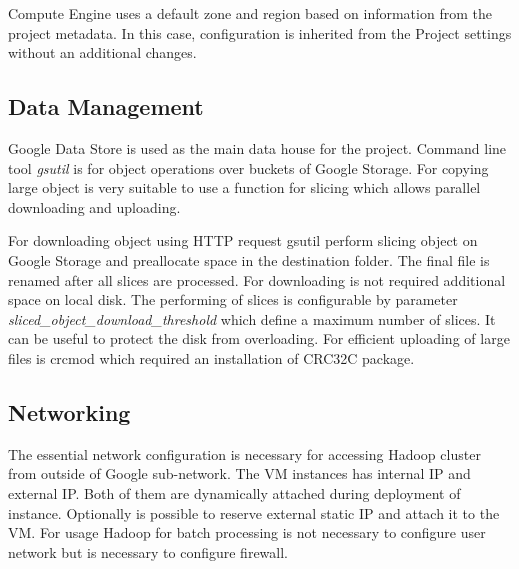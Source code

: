 \documentclass[a4paper,12pt,oneside]{report}
\begin{document}
	Compute Engine uses a default zone and region based on information from the
	project metadata. In this case,	configuration is inherited from the Project 
	settings without an additional changes.
	
	
	\subsection{Data Management}\label{data_mgr}
	Google Data Store is used as the main data house for the project. Command
	line tool \textit{gsutil} is for  object operations over buckets of Google Storage. 
	For copying large	object is very suitable to use 	a function for slicing which allows parallel 
	downloading and uploading.
	
	For downloading object using HTTP request gsutil perform slicing object on
	Google Storage  and preallocate space in the destination folder. 
	The final file is renamed after all slices are	processed. For downloading 
	is not required additional space on local disk. The performing of slices is configurable by parameter
	\textit{sliced\_object\_download\_threshold} which 	define a maximum number of slices. It can be 
	useful to protect the disk from overloading. For efficient uploading of large
	files is crcmod which required 	an installation  of CRC32C package. 
	
	\subsection{Networking}
	The essential network configuration is necessary  for accessing Hadoop cluster
	from outside of Google sub-network. The VM instances has internal IP and
	external IP. Both of them are dynamically attached during deployment of
	instance. Optionally is possible to reserve external static IP and attach it to
	the VM.  For usage Hadoop for batch processing is not necessary to configure
	user network but is necessary to configure firewall. 
	
\end{document}
